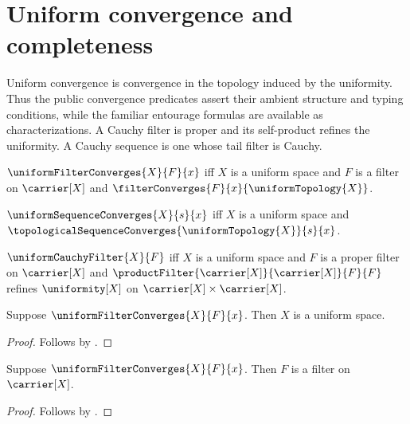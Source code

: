 






\section{Uniform convergence and completeness}

Uniform convergence is convergence in the topology induced by the
uniformity.  Thus the public convergence predicates assert their ambient
structure and typing conditions, while the familiar entourage formulas are
available as characterizations.  A Cauchy filter is proper and its
self-product refines the uniformity.  A Cauchy sequence is one whose tail
filter is Cauchy.

\begin{definition}\label{uniform_filter_convergence}
    $\uniformFilterConverges{X}{F}{x}$ iff
        $X$ is a uniform space and
        $F$ is a filter on $\carrier[X]$ and
        $\filterConverges{F}{x}{\uniformTopology{X}}$.
\end{definition}

\begin{definition}\label{uniform_sequence_convergence}
    $\uniformSequenceConverges{X}{s}{x}$ iff
        $X$ is a uniform space and
        $\topologicalSequenceConverges{\uniformTopology{X}}{s}{x}$.
\end{definition}

\begin{definition}\label{uniform_cauchy_filter}
    $\uniformCauchyFilter{X}{F}$ iff
        $X$ is a uniform space and
        $F$ is a proper filter on $\carrier[X]$ and
        $\productFilter{\carrier[X]}{\carrier[X]}{F}{F}$ refines
            $\uniformity[X]$ on
            $\carrier[X]\times\carrier[X]$.
\end{definition}

\begin{proposition}\label{uniform_filter_convergence_space}
    Suppose $\uniformFilterConverges{X}{F}{x}$.
    Then $X$ is a uniform space.
\end{proposition}
\begin{proof}
    Follows by .
\end{proof}

\begin{proposition}\label{uniform_filter_convergence_filter}
    Suppose $\uniformFilterConverges{X}{F}{x}$.
    Then $F$ is a filter on $\carrier[X]$.
\end{proposition}
\begin{proof}
    Follows by .
\end{proof}

